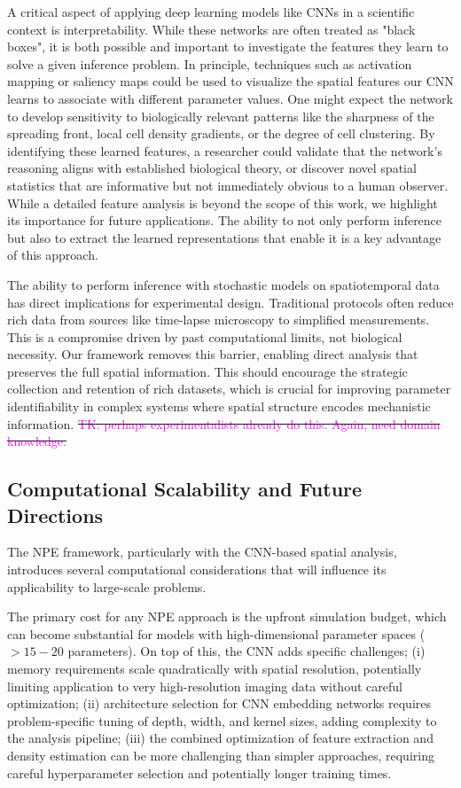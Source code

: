 \documentclass{article}
\makeatletter
\providecommand{\DIFdeltex}[1]{{\protect\color{red}\sout{#1}}} %
\providecommand{\DIFdelbegin}{} %
\providecommand{\DIFdelend}{} %
\providecommand{\DIFdel}[1]{\texorpdfstring{\DIFdeltex{#1}}{}} %
\newcommand{\DIFscaledelfig}{0.5}
\newlength{\DIFdelgraphicswidth} %
\newlength{\DIFdelgraphicsheight} %
\newcommand{\DIFdelincludegraphics}[2][]{%
\sbox{\DIFdelgraphicsbox}{\DIFOincludegraphics[#1]{#2}}%
\settoboxwidth{\DIFdelgraphicswidth}{\DIFdelgraphicsbox} %
\settoboxtotalheight{\DIFdelgraphicsheight}{\DIFdelgraphicsbox} %
\scalebox{\DIFscaledelfig}{%
\parbox[b]{\DIFdelgraphicswidth}{\usebox{\DIFdelgraphicsbox}\\[-\baselineskip] \rule{\DIFdelgraphicswidth}{0em}}\llap{\resizebox{\DIFdelgraphicswidth}{\DIFdelgraphicsheight}{%
\setlength{\unitlength}{\DIFdelgraphicswidth}%
\begin{picture}(1,1)%
\thicklines\linethickness{2pt} %
{\color[rgb]{1,0,0}\put(0,0){\framebox(1,1){}}}%
{\color[rgb]{1,0,0}\put(0,0){\line( 1,1){1}}}%
{\color[rgb]{1,0,0}\put(0,1){\line(1,-1){1}}}%
\end{picture}%
}\hspace*{3pt}}} %
} %
\DeclareRobustCommand{\DIFdelbegin}{\DIFOdelbegin \let\includegraphics\DIFdelincludegraphics} %
\DeclareRobustCommand{\DIFdelend}{\DIFOaddend \let\includegraphics\DIFOincludegraphics} %
\let\sout@orig\sout %
\renewcommand{\sout}[1]{\ifmmode\text{\sout@orig{\ensuremath{#1}}}\else\sout@orig{#1}\fi} %
\makeatother
\begin{document}
A critical aspect of applying deep learning models like CNNs in a scientific context is interpretability. While these networks are often treated as "black boxes", it is both possible and important to investigate the features they learn to solve a given inference problem. In principle, techniques such as activation mapping \cite{2023arXiv230914304M} or saliency maps \citep{2019arXiv191111293M} could be used to visualize the spatial features our CNN learns to associate with different parameter values.  One might expect the network to develop sensitivity to biologically relevant patterns like the sharpness of the spreading front, local cell density gradients, or the degree of cell clustering. By identifying these learned features, a researcher could validate that the network's reasoning aligns with established biological theory, or discover novel spatial statistics that are informative but not immediately obvious to a human observer. While a detailed feature analysis is beyond the scope of this work, we highlight its importance for future applications. The ability to not only perform inference but also to extract the learned representations that enable it is a key advantage of this approach. 

The ability to perform inference with stochastic models on spatiotemporal data has direct implications for experimental design. Traditional protocols often reduce rich data from sources like time-lapse microscopy to simplified measurements. This is a compromise driven by past computational limits, not biological necessity. Our framework removes this barrier, enabling direct analysis that preserves the full spatial information. This should encourage the strategic collection and retention of rich datasets, which is crucial for improving parameter identifiability in complex systems where spatial structure encodes mechanistic information.
\DIFdelbegin \DIFdel{\textcolor{magenta}{TK: perhaps experimentalists already do this. Again, need domain knowledge.}
}\DIFdelend 




\subsection{Computational Scalability and Future Directions}
The NPE framework, particularly with the CNN-based spatial analysis, introduces several computational considerations that will influence its applicability to large-scale problems.

The primary cost for any NPE approach is the upfront simulation budget, which can become substantial for models with high-dimensional parameter spaces ($> 15-20$ parameters). On top of this, the CNN adds specific challenges; (i) memory requirements scale quadratically with spatial resolution, potentially limiting application to very high-resolution imaging data without careful optimization; (ii) architecture selection for CNN embedding networks requires problem-specific tuning of depth, width, and kernel sizes, adding complexity to the analysis pipeline; (iii) the combined optimization of feature extraction and density estimation can be more challenging than simpler approaches, requiring careful hyperparameter selection and potentially longer training times.
\end{document}
